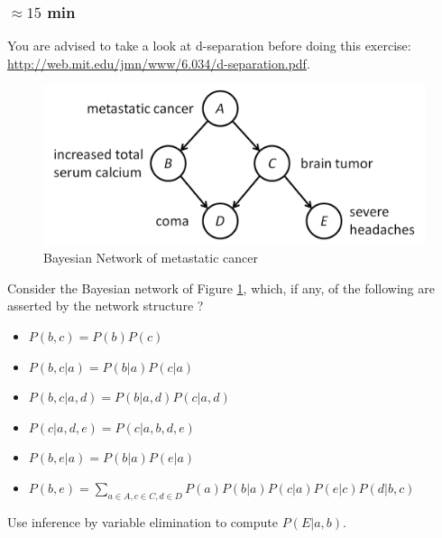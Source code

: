 \documentclass[a4paper, 10pt]{article}
\begin{document}
\subsubsection{$\approx 15$ min}
You are advised to take a look at d-separation before doing this exercise: \url{http://web.mit.edu/jmn/www/6.034/d-separation.pdf}.
\begin{figure}[H]
    \centering
    \includegraphics[width=1.\textwidth]{figures/pearl-bn-example.png}
    \caption{Bayesian Network of metastatic cancer}
    \label{fig:pearl-b-net}
\end{figure}
Consider the Bayesian network of Figure \ref{fig:pearl-b-net}, which, if any, of the following are asserted by the network structure ?
\begin{itemize}
    \item $P(b, c) = P(b)P(c)$
    \item $P(b, c|a) = P(b|a)P(c|a)$
    \item $P(b, c| a, d) = P(b|a, d) P(c|a, d)$
    \item $P(c|a, d, e) = P(c|a, b, d, e)$
    \item $P(b, e|a) = P(b|a)P(e|a)$
    \item $P(b, e) = \sum_{a \in A, c \in C, d \in D} P(a) P(b|a) P(c|a) P(e|c) P(d|b, c)$
\end{itemize}
Use inference by variable elimination to compute $P(E|a, b)$.
\end{document}
